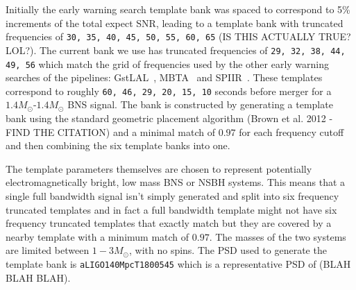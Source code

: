 Initially the early warning search template bank was spaced to correspond to 5\% increments of the total expect SNR, leading to a template bank with truncated frequencies of \verb|30, 35, 40, 45, 50, 55, 60, 65| (IS THIS ACTUALLY TRUE? LOL?). The current bank we use has truncated frequencies of \verb|29, 32, 38, 44, 49, 56| which match the grid of frequencies used by the other early warning searches of the pipelines: GstLAL~\cite{GstLAL:2020}, MBTA~\cite{MBTA:2021} and SPIIR~\cite{SPIIR:2020}. These templates correspond to roughly \verb|60, 46, 29, 20, 15, 10| seconds before merger for a $1.4M_\odot$-$1.4M_\odot$ BNS signal. The bank is constructed by generating a template bank using the standard geometric placement algorithm (Brown et al. 2012 - FIND THE CITATION) and a minimal match of $0.97$ for each frequency cutoff and then combining the six template banks into one.

The template parameters themselves are chosen to represent potentially electromagnetically bright, low mass BNS or NSBH systems. This means that a single full bandwidth signal isn't simply generated and split into six frequency truncated templates and in fact a full bandwidth template might not have six frequency truncated templates that exactly match but they are covered by a nearby template with a minimum match of $0.97$. The masses of the two systems are limited between $1-3 M_\odot$, with no spins. The PSD used to generate the template bank is \verb|aLIGO140MpcT1800545| which is a representative PSD of (BLAH BLAH BLAH).

